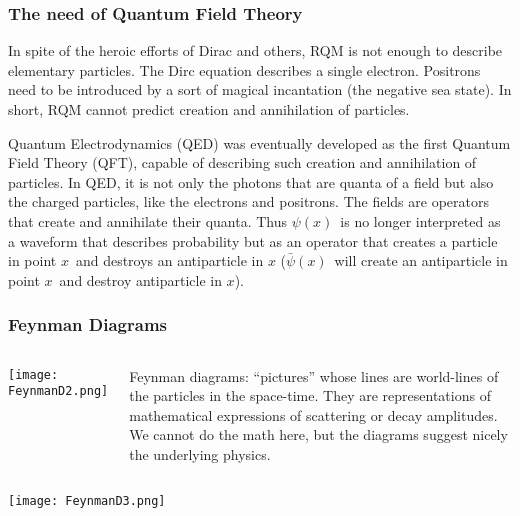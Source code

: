 \begin{frame}
\frametitle{The need of Quantum Field Theory}
In spite of the heroic efforts of Dirac and others, RQM is not enough to describe elementary particles. The Dirc equation describes a single electron. Positrons need to be introduced by a sort of magical incantation (the negative sea state). In short, RQM cannot predict creation and annihilation of particles. 

Quantum Electrodynamics (QED) was eventually developed as the first Quantum Field Theory (QFT), capable of describing such creation and annihilation of particles. In QED, it is not only the photons that are quanta of a field but also the charged particles, like the electrons and positrons. The fields are operators that create and annihilate their quanta. \alert{Thus $\psi(x)$~is no longer interpreted as a waveform that describes probability but as an operator that creates a particle in point $x$~and destroys an antiparticle in $x$ ($\bar{\psi}(x)$~will create an antiparticle in point $x$~and destroy antiparticle in $x$)}.

%
%


\end{frame}

\begin{frame}
\frametitle{Feynman Diagrams}
\begin{columns}
\texttt{[image: FeynmanD2.png]}
 
Feynman diagrams: ``pictures'' whose lines are world-lines of the particles in the space-time. They are representations of mathematical expressions of scattering or decay amplitudes. We cannot do the math here, but the diagrams suggest nicely the underlying physics. 

\end{columns}
\end{frame}
\begin{frame}
\texttt{[image: FeynmanD3.png]}

\end{frame}
